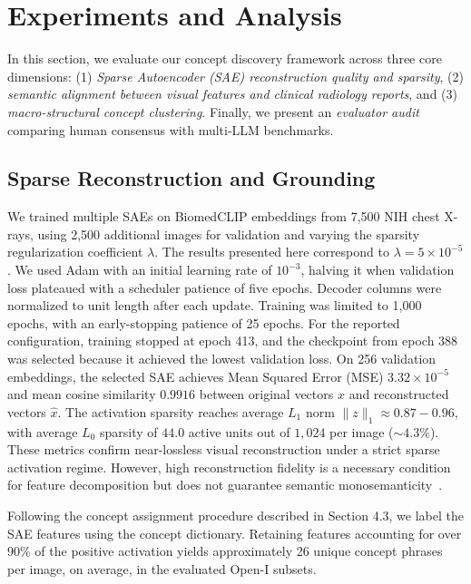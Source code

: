 \section{Experiments and Analysis}

In this section, we evaluate our concept discovery framework across three core dimensions: (1) \emph{Sparse Autoencoder (SAE) reconstruction quality and sparsity}, (2) \emph{semantic alignment between visual features and clinical radiology reports}, and (3) \emph{macro-structural concept clustering}. Finally, we present an \emph{evaluator audit} comparing human consensus with multi-LLM benchmarks.


\subsection{Sparse Reconstruction and Grounding}
We trained multiple SAEs on BiomedCLIP embeddings from 7,500 NIH chest X-rays, using 2,500 additional images for validation and varying the sparsity regularization coefficient $\lambda$. The results presented here correspond to $\lambda = 5 \times 10^{-5}$. We used Adam with an initial learning rate of $10^{-3}$, halving it when validation loss plateaued with a scheduler patience of five epochs. Decoder columns were normalized to unit length after each update. Training was limited to 1,000 epochs, with an early-stopping patience of 25 epochs. For the reported configuration, training stopped at epoch 413, and the checkpoint from epoch 388 was selected because it achieved the lowest validation loss.
On 256 validation embeddings, the selected SAE achieves Mean Squared Error (MSE) $3.32\times10^{-5}$ and mean cosine similarity $0.9916$ between original vectors $x$ and reconstructed vectors $\hat{x}$. The activation sparsity reaches average $L_1$ norm $\|z\|_1 \approx 0.87 - 0.96$, with average $L_0$ sparsity of $44.0$ active units out of $1,024$ per image ($\sim 4.3\%$). These metrics confirm near-lossless visual reconstruction under a strict sparse activation regime. However, high reconstruction fidelity is a necessary condition for feature decomposition but does not guarantee semantic monosemanticity~\cite{bricken2023monosemanticity}.

Following the concept assignment procedure described in Section 4.3, we label the SAE features using the concept dictionary. Retaining features accounting for over 90\% of the positive activation yields approximately 26 unique concept phrases per image, on average, in the evaluated Open-I subsets.

